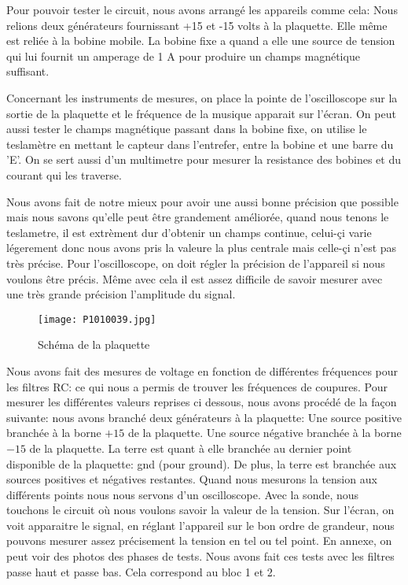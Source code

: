 

Pour pouvoir tester le circuit, nous avons arrangé les appareils comme cela: Nous relions deux générateurs fournissant +15 et
-15 volts à la plaquette. Elle même est reliée à la bobine mobile. La bobine fixe a quand a elle une source de tension qui
lui fournit un amperage de 1 A pour produire un champs magnétique suffisant.


Concernant les instruments de mesures, on place la pointe de l'oscilloscope sur la sortie de la plaquette et le fréquence
de la musique apparait sur l'écran. On peut aussi tester le champs magnétique passant dans la bobine fixe, on utilise le
teslamètre en mettant le capteur dans l'entrefer, entre la bobine et une barre du 'E'. On se sert aussi d'un multimetre
pour mesurer la resistance des bobines et du courant qui les traverse.


Nous avons fait de notre mieux pour avoir une aussi bonne précision que possible mais nous savons qu'elle peut être grandement
améliorée, quand nous tenons le teslametre, il est extrèment dur d'obtenir un champs continue, celui-çi varie légerement donc
nous avons pris la valeure la plus centrale mais celle-çi n'est pas très précise. Pour l'oscilloscope, on doit régler
la précision de l'appareil si nous voulons être précis. Même avec cela il est assez difficile de savoir mesurer avec une
très grande précision l'amplitude du signal.

\begin{figure}[ht!]
    \centering
    \texttt{[image: P1010039.jpg]}
    \caption{Schéma de la plaquette}
    \label{plaquette}
\end{figure}



Nous avons fait des mesures de voltage en fonction de différentes fréquences pour les filtres RC: ce qui nous a permis
de trouver les fréquences de coupures. Pour mesurer les différentes valeurs reprises ci dessous, nous avons procédé de la
façon suivante: nous avons branché deux générateurs à la plaquette: Une source positive branchée à la borne $+15$ de la plaquette.
Une source négative branchée à la borne $-15$ de la plaquette. La terre est quant à elle branchée au dernier point
disponible de la plaquette: gnd (pour ground). De plus, la terre est branchée aux sources positives et négatives
restantes. Quand nous mesurons la tension aux différents points nous nous servons d'un oscilloscope. Avec la sonde,
nous touchons le circuit où nous voulons savoir la valeur de la tension. Sur l'écran, on voit apparaitre le
signal, en réglant l'appareil sur le bon ordre de grandeur, nous pouvons mesurer assez précisement la tension en
tel ou tel point. En annexe, on peut voir des photos des phases de tests.
  Nous avons fait ces tests avec les filtres
passe haut et passe bas. Cela correspond au bloc 1 et 2.

